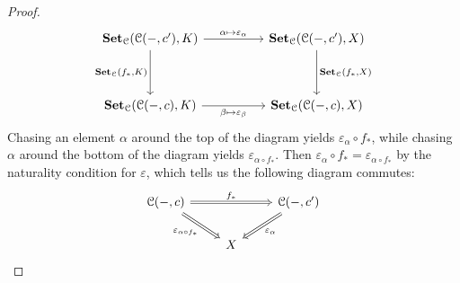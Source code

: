 \documentclass{amsart}
\theoremstyle{plain}
\theoremstyle{definition}
\newcommand{\Set}{\mbf{Set}}
\newcommand{\0}{\mathbf{0}}
\newcommand{\cC}{\mathcal C}
\newcommand{\mbf}[1]{\mathbf{#1}}
\newcommand{\vare}{\varepsilon}
\renewcommand{\(}{\left(}
\renewcommand{\)}{\right)}
\begin{document}
\begin{enumerate}
\begin{proof}
    \[\begin{tikzcd}
      {\Set_\cC(\cC(-,c'),K)} && {\Set_\cC(\cC(-,c'),X)} \\
      \\
      {\Set_\cC(\cC(-,c),K)} && {\Set_\cC(\cC(-,c),X)}
      \arrow["{\alpha\mapsto\vare_\alpha}", from=1-1, to=1-3]
      \arrow["{\Set_\cC(f_\ast,X)}", from=1-3, to=3-3]
      \arrow["{\Set_\cC(f_\ast,K)}"', from=1-1, to=3-1]
      \arrow["{\beta\mapsto\vare_\beta}"', from=3-1, to=3-3]
    \end{tikzcd}\]
    Chasing an element $\alpha$ around the top of the diagram yields $\vare_\alpha\circ f_\ast$, while chasing $\alpha$ around the bottom of the diagram yields $\vare_{\alpha\circ f_\ast}$. Then $\vare_\alpha\circ f_\ast=\vare_{\alpha\circ f_\ast}$ by the naturality condition for $\vare$, which tells us the following diagram commutes:
    \[\begin{tikzcd}
      {\cC(-,c)} && {\cC(-,c')} \\
      & X
      \arrow["{f_\ast}", Rightarrow, from=1-1, to=1-3]
      \arrow["{\vare_\alpha}", Rightarrow, from=1-3, to=2-2]
      \arrow["{\vare_{\alpha\circ f_\ast}}"', Rightarrow, from=1-1, to=2-2]
    \end{tikzcd}\]
  \end{proof}
\end{enumerate}
\end{document}
